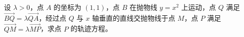 \begin{question}
设 $\lambda>0$，点 $A$ 的坐标为 $(1,1)$，点 $B$ 在抛物线 $y=x^2$ 上运动，点 $Q$ 满足 $\overrightarrow{BQ}=\lambda\overrightarrow{QA}$，经过点 $Q$ 与 $x$ 轴垂直的直线交抛物线于点 $M$，点 $P$ 满足 $\overrightarrow{QM}=\lambda\overrightarrow{MP}$，求点 $P$ 的轨迹方程。
\nopagebreak[4]
\begin{center}\end{center}
\nopagebreak[4]

\end{question}